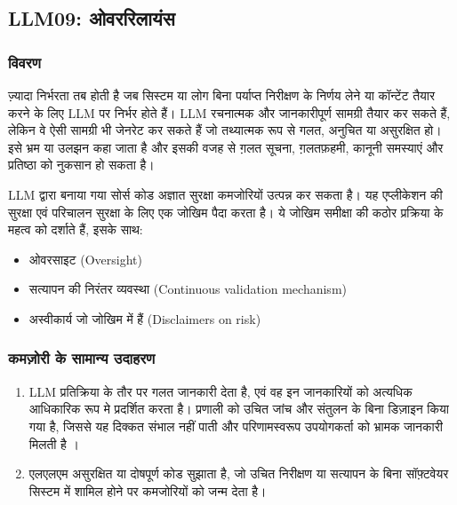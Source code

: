 \documentclass[
]{article}
\author{}
\date{}
\providecommand{\tightlist}{%
  \setlength{\itemsep}{0pt}\setlength{\parskip}{0pt}}
\begin{document}
\subsection{LLM09:
ओवररिलायंस}\label{llm09-ux913ux935ux930ux930ux932ux92fux938}

\subsubsection{विवरण}\label{ux935ux935ux930ux923}

ज़्यादा निर्भरता तब होती है जब सिस्टम या लोग बिना पर्याप्त निरीक्षण के निर्णय लेने
या कॉन्टेंट तैयार करने के लिए LLM पर निर्भर होते हैं। LLM रचनात्मक और जानकारीपूर्ण
सामग्री तैयार कर सकते हैं, लेकिन वे ऐसी सामग्री भी जेनरेट कर सकते हैं जो तथ्यात्मक रूप से
गलत, अनुचित या असुरक्षित हो। इसे भ्रम या उलझन कहा जाता है और इसकी वजह से ग़लत
सूचना, ग़लतफ़हमी, कानूनी समस्याएं और प्रतिष्ठा को नुकसान हो सकता है।

LLM द्वारा बनाया गया सोर्स कोड अज्ञात सुरक्षा कमजोरियों उत्पन्न कर सकता है। यह
एप्लीकेशन की सुरक्षा एवं परिचालन सुरक्षा के लिए एक जोखिम पैदा करता है। ये जोखिम
समीक्षा की कठोर प्रक्रिया के महत्व को दर्शाते हैं, इसके साथ:

\begin{itemize}
\tightlist
\item
  ओवरसाइट (Oversight)
\item
  सत्यापन की निरंतर व्यवस्था (Continuous validation mechanism)
\item
  अस्वीकार्य जो जोखिम में हैं (Disclaimers on risk)
\end{itemize}

\subsubsection{कमज़ोरी के सामान्य
उदाहरण}\label{ux915ux92eux95bux930-ux915-ux938ux92eux928ux92f-ux909ux926ux939ux930ux923}

\begin{enumerate}
\def\labelenumi{\arabic{enumi}.}
\tightlist
\item
  LLM प्रतिक्रिया के तौर पर गलत जानकारी देता है, एवं वह इन जानकारियों को अत्यधिक
  आधिकारिक रूप मे प्रदर्शित करता है। प्रणाली को उचित जांच और संतुलन के बिना डिज़ाइन
  किया गया है, जिससे यह दिक्कत संभाल नहीं पाती और परिणामस्वरूप उपयोगकर्ता को
  भ्रामक जानकारी मिलती है ।
\item
  एलएलएम असुरक्षित या दोषपूर्ण कोड सुझाता है, जो उचित निरीक्षण या सत्यापन के बिना
  सॉफ़्टवेयर सिस्टम में शामिल होने पर कमजोरियों को जन्म देता है।
\end{enumerate}
\end{document}
